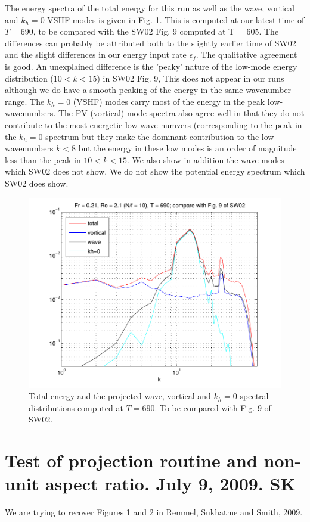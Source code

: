 \documentclass[12pt]{article}
\begin{document}
The energy spectra of the total energy for this run as well as the
wave, vortical and $k_h=0$ VSHF modes is given in Fig.
\ref{NF10_spec}. This is computed at our latest time of $T=690$, to be
compared with the SW02 Fig. 9 computed at T = 605. The differences can
probably be attributed both to the slightly earlier time of SW02 and
the slight differences in our energy input rate $\epsilon_f$. The
qualitative agreement is good. An unexplained difference is the
'peaky' nature of the low-mode energy distribution ($10< k < 15$) in
SW02 Fig. 9, This does not appear in our runs although we do have a
smooth peaking of the energy in the same wavenumber range.  The $k_h =
0$ (VSHF) modes carry most of the energy in the peak low-wavenumbers.
The PV (vortical) mode spectra also agree well in that they do not
contribute to the most energetic low wave numvers (corresponding to
the peak in the $k_h=0$ spectrum but they make the dominant
contribution to the low wavenumbers $k < 8$ but the energy in these
low modes is an order of magnitude less than the peak in $10< k <15$.
We also show in addition the wave modes which SW02 does not show. We
do not show the potential energy spectrum which SW02 does show.
\begin{figure}[ht]
\centering 
 \includegraphics[scale = 0.7]{Comp_SW02_fig9}
 \caption{Total energy and the projected wave, vortical and $k_h=0$
   spectral distributions computed at $T= 690$. To be compared with
   Fig. 9 of SW02. \label{NF10_spec}}
\end{figure}

\section{Test of projection routine and non-unit aspect ratio. July 9, 2009. SK}
We are trying to recover Figures 1 and 2 in Remmel, Sukhatme and Smith, 2009. 
\end{document}
